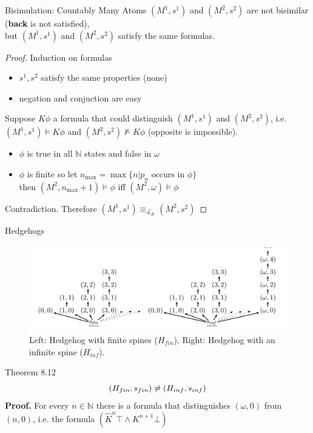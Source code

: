 \documentclass{beamer}
\newcommand{\lang}{\mathcal{L}}
\begin{document}
\begin{frame}{Bisimulation: Countably Many Atoms}
	$(M^1,s^1)$ and $(M^2,s^2)$ are not bisimilar (\textbf{back} is not satisfied),\\
	but $(M^1,s^1)$ and $(M^2,s^2)$ satisfy the same formulas. \pause
	\begin{proof}
		Induction on formulas
		\begin{itemize}
			\item $s^1,s^2$ satisfy the same properties (none)
			\item negation and conjuction are easy
		\end{itemize} \pause
		Suppose $K\phi$ a formula that could distinguish $(M^1,s^1)$ and $(M^2,s^2)$, i.e. $(M^1,s^1) \models K\phi$ and $(M^2,s^2) \not\models K\phi$ (opposite is impossible).
		\begin{itemize}
			\item $\phi$ is true in all $\mathbb{N}$ states and false in $\omega$
			\item $\phi$ is finite so let $n_{\max} = \max \{n|p_n \text{ occurs in } \phi\}$\\
				then $(M^2,n_{\max}+1) \models \phi$ iff $(M^2,\omega) \models \phi$
		\end{itemize} \pause
		Contradiction. Therefore $(M^1,s^1) \equiv_{\lang_K} (M^2,s^2)$
	\end{proof}
\end{frame}

\begin{frame}{Hedgehogs}
	\begin{figure}[h]
		\includegraphics[width=1\textwidth]{figure_8_1_hedgehog_models}
		\caption{Left: Hedgehog with finite spines ($H_{fin}$), Right: Hedgehog with an infinite spine ($H_{inf}$).}
	\end{figure} \pause
	\begin{block}{Theorem 8.12}
		\[(H_{fin},s_{fin}) \not\leftrightarroweq (H_{inf},s_{inf})\] \pause
		\textbf{Proof.} For every $n \in \mathbb{N}$  there is a formula that distinguishes $(\omega,0)$ from $(n,0)$, i.e. the formula $(\hat{K}^n \top \wedge K^{n+1} \bot)$
	\end{block}
\end{frame}
\end{document}
